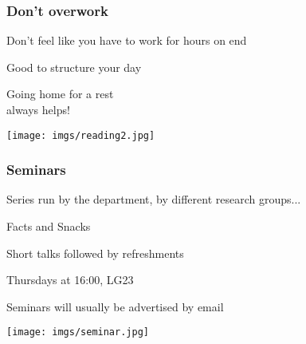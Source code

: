 \begin{frame}
    \frametitle{Don't overwork}
    \centering
    \begin{minipage}{0.4\textwidth}
        \centering
        \Large

        Don't feel like you have to work
        for hours on end

        \vspace{1em}

        Good to \alert{structure} your day

        \vspace{1em}

        Going home for a rest \\
        always helps!
    \end{minipage}
    \qquad
    \begin{minipage}{0.4\textwidth}
        \texttt{[image: imgs/reading2.jpg]}
    \end{minipage}
\end{frame}
\begin{frame}
    \frametitle{Seminars}
    \centering
    \begin{minipage}{0.4\textwidth}
        \centering
        \large

        \vspace{1em}

        Series run by the department, by different research groups...

        \vspace{1em}

        \alert{Facts and Snacks}

        Short talks followed by refreshments

        \alert{Thursdays at 16:00, LG23}

        \vspace{1em}

        Seminars will usually be advertised by \alert{email}
    \end{minipage}
    \qquad
    \begin{minipage}{0.4\textwidth}
        \texttt{[image: imgs/seminar.jpg]}
    \end{minipage}
\end{frame}
